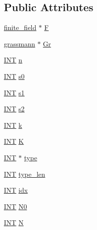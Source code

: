 \subsection*{Public Attributes}
\begin{DoxyCompactItemize}
\item 
\mbox{\hyperlink{classfinite__field}{finite\+\_\+field}} $\ast$ \mbox{\hyperlink{classflag_a32217a9c8e1d3d02b0177d6ec8158a2a}{F}}
\item 
\mbox{\hyperlink{classgrassmann}{grassmann}} $\ast$ \mbox{\hyperlink{classflag_a4e7e5cd2bcbab0651ec383cd6ee62f3d}{Gr}}
\item 
\mbox{\hyperlink{galois_8h_a09fddde158a3a20bd2dcadb609de11dc}{I\+NT}} \mbox{\hyperlink{classflag_abf9ddf5f3ac458ab8bcfbec879ffcf95}{n}}
\item 
\mbox{\hyperlink{galois_8h_a09fddde158a3a20bd2dcadb609de11dc}{I\+NT}} \mbox{\hyperlink{classflag_a3fbef232fc91107ac7bb4172df081e35}{s0}}
\item 
\mbox{\hyperlink{galois_8h_a09fddde158a3a20bd2dcadb609de11dc}{I\+NT}} \mbox{\hyperlink{classflag_a36bcf53a21ee0cc20a27d1cebec525eb}{s1}}
\item 
\mbox{\hyperlink{galois_8h_a09fddde158a3a20bd2dcadb609de11dc}{I\+NT}} \mbox{\hyperlink{classflag_aafd4d6136c1bfec1c4c96ceb44eda07f}{s2}}
\item 
\mbox{\hyperlink{galois_8h_a09fddde158a3a20bd2dcadb609de11dc}{I\+NT}} \mbox{\hyperlink{classflag_a0b228155e47b29f412119b20eb3aae5e}{k}}
\item 
\mbox{\hyperlink{galois_8h_a09fddde158a3a20bd2dcadb609de11dc}{I\+NT}} \mbox{\hyperlink{classflag_a033d950a7ea08121877317c98480c2fa}{K}}
\item 
\mbox{\hyperlink{galois_8h_a09fddde158a3a20bd2dcadb609de11dc}{I\+NT}} $\ast$ \mbox{\hyperlink{classflag_a704364aedcf79da39e9a41391602fd92}{type}}
\item 
\mbox{\hyperlink{galois_8h_a09fddde158a3a20bd2dcadb609de11dc}{I\+NT}} \mbox{\hyperlink{classflag_a5c21f6e2775ed149670dc0ceacf3df7f}{type\+\_\+len}}
\item 
\mbox{\hyperlink{galois_8h_a09fddde158a3a20bd2dcadb609de11dc}{I\+NT}} \mbox{\hyperlink{classflag_a756f878c42eebec879fb22b80f74d07a}{idx}}
\item 
\mbox{\hyperlink{galois_8h_a09fddde158a3a20bd2dcadb609de11dc}{I\+NT}} \mbox{\hyperlink{classflag_a065666a7e3aa7806236ff5fd5ec8b16a}{N0}}
\item 
\mbox{\hyperlink{galois_8h_a09fddde158a3a20bd2dcadb609de11dc}{I\+NT}} \mbox{\hyperlink{classflag_a9e1c5cf674fc941922789ff4294d070c}{N}}

\end{DoxyCompactItemize}
